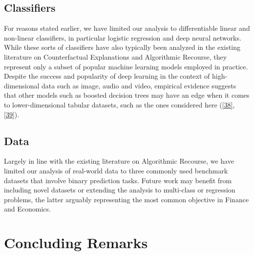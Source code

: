 \documentclass[conference,final,]{IEEEtran}
\theoremstyle{definition}
\theoremstyle{definition}
\theoremstyle{definition}
\theoremstyle{definition}
\theoremstyle{remark}
\begin{document}
\hypertarget{classifiers}{%
\subsection{Classifiers}\label{classifiers}}

For reasons stated earlier, we have limited our analysis to differentiable linear and non-linear classifiers, in particular logistic regression and deep neural networks. While these sorts of classifiers have also typically been analyzed in the existing literature on Counterfactual Explanations and Algorithmic Recourse, they represent only a subset of popular machine learning models employed in practice. Despite the success and popularity of deep learning in the context of high-dimensional data such as image, audio and video, empirical evidence suggests that other models such as boosted decision trees may have an edge when it comes to lower-dimensional tabular datasets, such as the ones considered here (\protect\hyperlink{ref-borisov2021deep}{{[}38{]}}, \protect\hyperlink{ref-grinsztajn2022why}{{[}39{]}}).

\hypertarget{limit-data}{%
\subsection{Data}\label{limit-data}}

Largely in line with the existing literature on Algorithmic Recourse, we have limited our analysis of real-world data to three commonly used benchmark datasets that involve binary prediction tasks. Future work may benefit from including novel datasets or extending the analysis to multi-class or regression problems, the latter arguably representing the most common objective in Finance and Economics.

\hypertarget{conclusion}{%
\section{Concluding Remarks}\label{conclusion}}
\end{document}
